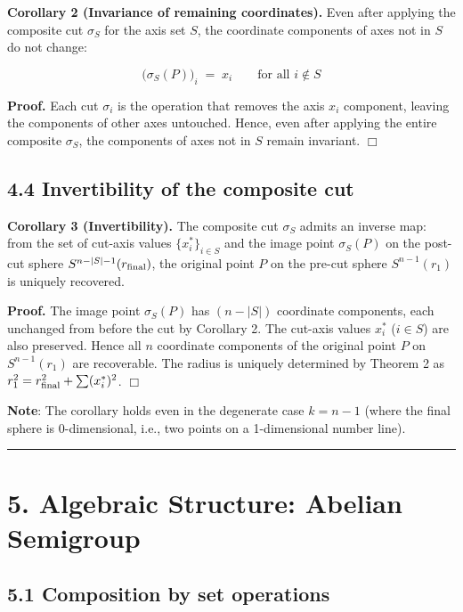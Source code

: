 \documentclass[a4paper,11pt]{article}
\theoremstyle{definition}
\theoremstyle{remark}
\begin{document}
\textbf{Corollary 2 (Invariance of remaining coordinates).} Even after
applying the composite cut \(\sigma_S\) for the axis set \(S\), the
coordinate components of axes not in \(S\) do not change:

\[
\bigl(\sigma_S(P)\bigr)_i \;=\; x_i \qquad \text{for all } i \notin S
\]

\textbf{Proof.} Each cut \(\sigma_i\) is the operation that removes the
axis \(x_i\) component, leaving the components of other axes untouched.
Hence, even after applying the entire composite \(\sigma_S\), the
components of axes not in \(S\) remain invariant. \(\Box\)

\subsection{4.4 Invertibility of the composite
cut}\label{invertibility-of-the-composite-cut}

\textbf{Corollary 3 (Invertibility).} The composite cut \(\sigma_S\)
admits an inverse map: from the set of cut-axis values
\(\{x_i^{*}\}_{i \in S}\) and the image point \(\sigma_S(P)\) on the
post-cut sphere \(S^{n-|S|-1}(r_{\rm final})\), the original point \(P\)
on the pre-cut sphere \(S^{n-1}(r_1)\) is uniquely recovered.

\textbf{Proof.} The image point \(\sigma_S(P)\) has \((n - |S|)\)
coordinate components, each unchanged from before the cut by Corollary
2. The cut-axis values \(x_i^{*}\) (\(i \in S\)) are also preserved.
Hence all \(n\) coordinate components of the original point \(P\) on
\(S^{n-1}(r_1)\) are recoverable. The radius is uniquely determined by
Theorem 2 as \(r_1^2 = r_{\rm final}^2 + \sum (x_i^{*})^2\). \(\Box\)

\textbf{Note}: The corollary holds even in the degenerate case
\(k = n - 1\) (where the final sphere is 0-dimensional, i.e., two points
on a 1-dimensional number line).

\begin{center}\rule{0.5\linewidth}{0.5pt}\end{center}

\section{5. Algebraic Structure: Abelian
Semigroup}\label{algebraic-structure-abelian-semigroup}

\subsection{5.1 Composition by set
operations}\label{composition-by-set-operations}
\end{document}
